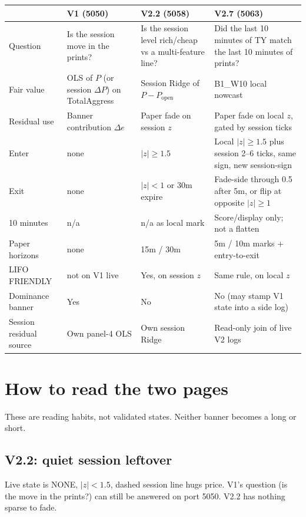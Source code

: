 \documentclass[11pt]{article}
\newcommand{\abs}[1]{\lvert #1 \rvert}
\begin{document}
\begin{center}
\begin{tabular}{@{}p{}p{}p{}p{}@{}}
\toprule
 & V1 (5050) & V2.2 (5058) & V2.7 (5063) \\
\midrule
Question & Is the session move in the prints? & Is the session level rich/cheap vs a multi-feature line? & Did the last 10 minutes of TY match the last 10 minutes of prints? \\
Fair value & OLS of \(P\) (or session \(\Delta P\)) on TotalAggress & Session Ridge of \(P-P_{\mathrm{open}}\) & B1\_W10 local nowcast \\
Residual use & Banner contribution \(\Delta e\) & Paper fade on session \(z\) & Paper fade on local \(z\), gated by session ticks \\
Enter & none & \(\abs{z}\ge 1.5\) & Local \(\abs{z}\ge 1.5\) plus session 2--6 ticks, same sign, new session-sign \\
Exit & none & \(\abs{z}<1\) or 30m expire & Fade-side through 0.5 after 5m, or flip at opposite \(\abs{z}\ge 1\) \\
10 minutes & n/a & n/a as local mark & Score/display only; not a flatten \\
Paper horizons & none & 15m / 30m & 5m / 10m marks + entry-to-exit \\
LIFO FRIENDLY & not on V1 live & Yes, on session \(z\) & Same rule, on local \(z\) \\
Dominance banner & Yes & No & No (may stamp V1 state into a side log) \\
Session residual source & Own panel-4 OLS & Own session Ridge & Read-only join of live V2 logs \\
\bottomrule
\end{tabular}
\end{center}


\section{How to read the two pages}

These are reading habits, not validated states.  Neither banner
becomes a long or short.

\subsection{V2.2: quiet session leftover}

Live state is NONE, \(\abs{z}<1.5\), dashed session line hugs
price.  V1's question (is the move in the prints?) can still be
answered on port 5050.  V2.2 has nothing sparse to fade.
\end{document}
